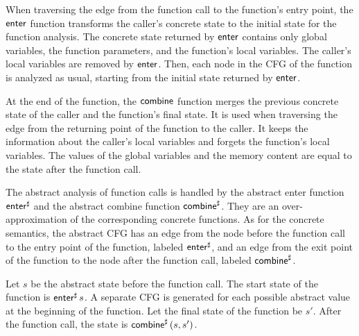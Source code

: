 When traversing the edge from the function call to the function's entry point, the $\textsf{enter}$ function transforms the caller's concrete state to the initial state for the function analysis.
The concrete state returned by $\textsf{enter}$ contains only global variables, the function parameters, and the function's local variables.
The caller's local variables are removed by $\textsf{enter}$.
Then, each node in the CFG of the function is analyzed as usual,
starting from the initial state returned by $\textsf{enter}$.

At the end of the function, the $\textsf{combine}$ function merges the previous concrete state of the caller and the function's final state.
It is used when traversing the edge from the returning point of the function to the caller.
It keeps the information about the caller's local variables and forgets the function's local variables.
The values of the global variables and the memory content are equal to the state after the function call.

The abstract analysis of function calls is handled by the abstract enter function $\textsf{enter}^\sharp$ and the abstract combine function $\textsf{combine}^\sharp$.
They are an over-approximation of the corresponding concrete functions.
As for the concrete semantics, the abstract CFG has an edge from the node before the function call to the entry point of the function, labeled $\textsf{enter}^\sharp$, and an edge from the exit point of the function to the node after the function call, labeled $\textsf{combine}^\sharp$.

Let $s$ be the abstract state before the function call.
The start state of the function is $\textsf{enter}^\sharp\,s$.
A separate CFG is generated for each possible abstract value at the beginning of the function.
Let the final state of the function be $s'$.
After the function call, the state is $\textsf{combine}^\sharp\,(s,s')$.


